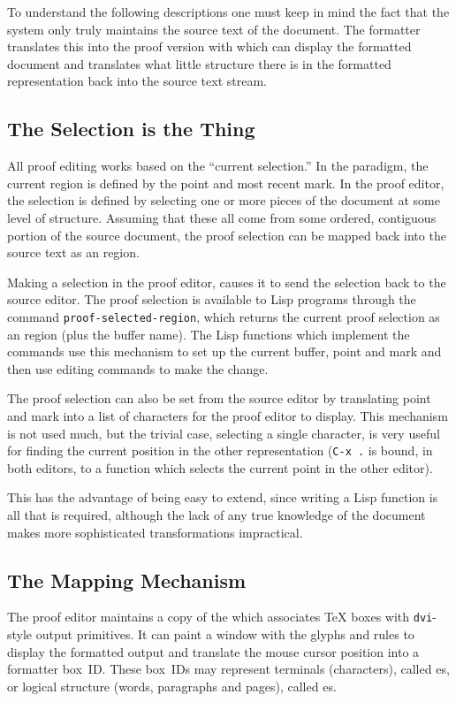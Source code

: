 To understand the following descriptions one must keep in mind the fact
that the system only truly maintains the source text of the document.
The formatter translates this into the proof version with which {\VorTeX}
can display the formatted document and translates what little structure
there is in the formatted representation back into the source text stream.

\subsection{The Selection is the Thing}

All proof editing works based on the ``current selection.''  In the
{\EMACS} paradigm, the current region is defined by the point and most
recent mark.  In the proof editor, the selection is defined by selecting
one or more pieces of the document at some level of structure.  Assuming
that these all come from some ordered, contiguous portion of the source
document, the proof selection can be mapped back into the source text
as an {\EMACS} region.

Making a selection in the proof editor, causes it to send the selection
back to the source editor.  The proof selection is available to Lisp
programs through the command {\tt proof-selected-region}, which returns
the current proof selection as an {\EMACS} region (plus the buffer name).
The Lisp functions which implement the {\WYSIWYG} commands use this mechanism
to set up the current buffer, point and mark and then use {\EMACS}
editing commands to make the change.

The proof selection can also be set from the source editor by translating
point and mark into a list of characters for the proof editor to display.
This mechanism is not used much, but the trivial case, selecting a single
character, is very useful for finding the current position in the other
representation ({\tt C-x .} is bound, in both editors, to a function
which selects the current point in the other editor).

This has the advantage of being easy to extend, since writing a Lisp
function is all that is required, although the lack of any true
knowledge of the document makes more sophisticated transformations
impractical.

\subsection{The Mapping Mechanism}

The proof editor maintains a copy of the {\IRT} which associates {\TeX}
boxes with {\tt dvi}-style output primitives.  It can paint a window with
the glyphs and rules to display the formatted output and translate the
mouse cursor position into a formatter box~ID.  These {\IRI} box~IDs
may represent terminals (characters), called \tbox es, or logical
structure (words, paragraphs and pages), called \nbox es.

